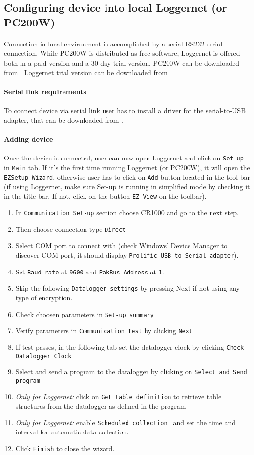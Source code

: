 \subsection{Configuring device into local Loggernet (or PC200W)}
\paragraph{}
Connection in local environment is accomplished by a serial RS232 serial connection. While PC200W is distributed as free software, Loggernet is offered both in a paid version and a 30-day trial version. PC200W can be downloaded from \cite{cs1}. Loggernet trial version can be downloaded from \cite{cs2}
\paragraph{Serial link requirements}
To connect device via serial link user has to install a driver for the serial-to-USB adapter, that can be downloaded from \cite{prol1}. 
\paragraph{Adding device}
Once the device is connected, user can now open Loggernet and click on {\tt Set-up} in {\tt Main} tab. If it's the first time running Loggernet (or PC200W), it will open the {\tt EZSetup Wizard}, 
otherwise user has to click on {\tt Add} button located in the tool-bar (if using Loggernet, make sure Set-up is running in simplified mode by checking it in the title bar. If not, click on the button {\tt EZ View} on the toolbar).
\begin{enumerate}
	\item In {\tt Communication Set-up} section choose CR1000 and go to the next step.
	\item Then choose connection type {\tt Direct}
	\item Select COM port to connect with (check Windows' Device Manager to discover COM port, it should display {\tt Prolific USB to Serial adapter}).
	\item Set {\tt Baud rate} at {\tt 9600} and {\tt PakBus Address} at {\tt 1}.
	\item Skip the following {\tt Datalogger settings} by pressing Next if not using any type of encryption.
	\item Check choosen parameters in {\tt Set-up summary}
	\item Verify parameters in {\tt Communication Test} by clicking {\tt Next}
	\item If test passes, in the following tab set the datalogger clock by clicking {\tt Check Datalogger Clock}
	\item Select and send a program to the datalogger by clicking on {\tt Select and Send program}
	\item \emph{Only for Loggernet:} click on {\tt Get table definition} to retrieve table structures from the datalogger as defined in the program
	\item \emph{Only for Loggernet:} enable {\tt Scheduled collection }  and set the time  and interval for automatic data collection.
	\item Click {\tt Finish} to close the wizard.
\end{enumerate}
